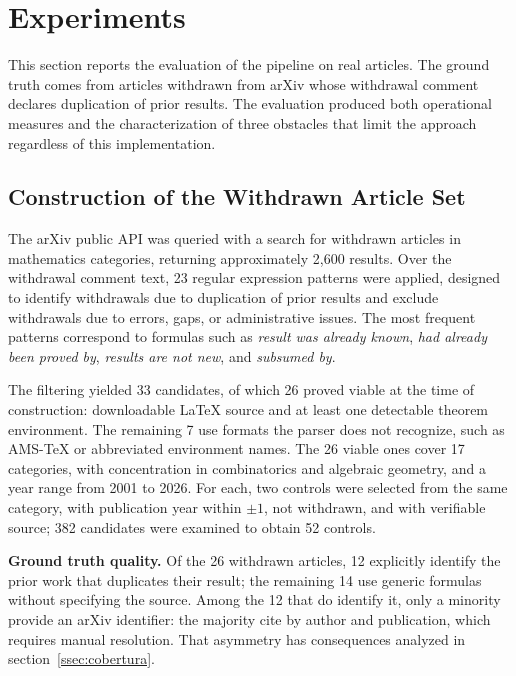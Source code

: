 \section{Experiments}

\label{sec:experimentos}

This section reports the evaluation of the pipeline on real articles. The ground truth comes from articles withdrawn from arXiv whose withdrawal comment declares duplication of prior results. The evaluation produced both operational measures and the characterization of three obstacles that limit the approach regardless of this implementation.

\subsection{Construction of the Withdrawn Article Set}

The arXiv public API was queried with a search for withdrawn articles in mathematics categories, returning approximately 2,600 results. Over the withdrawal comment text, 23 regular expression patterns were applied, designed to identify withdrawals due to duplication of prior results and exclude withdrawals due to errors, gaps, or administrative issues. The most frequent patterns correspond to formulas such as \textit{result was already known}, \textit{had already been proved by}, \textit{results are not new}, and \textit{subsumed by}.

The filtering yielded 33 candidates, of which 26 proved viable at the time of construction: downloadable LaTeX source and at least one detectable theorem environment. The remaining 7 use formats the parser does not recognize, such as AMS-\TeX{} or abbreviated environment names. The 26 viable ones cover 17 categories, with concentration in combinatorics and algebraic geometry, and a year range from 2001 to 2026. For each, two controls were selected from the same category, with publication year within $\pm 1$, not withdrawn, and with verifiable source; 382 candidates were examined to obtain 52 controls.

\textbf{Ground truth quality.} Of the 26 withdrawn articles, 12 explicitly identify the prior work that duplicates their result; the remaining 14 use generic formulas without specifying the source. Among the 12 that do identify it, only a minority provide an arXiv identifier: the majority cite by author and publication, which requires manual resolution. That asymmetry has consequences analyzed in section~\ref{ssec:cobertura}.

